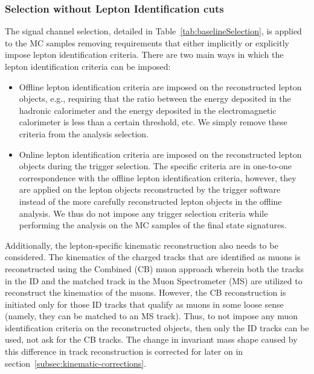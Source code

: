 \subsubsection{Selection without Lepton Identification cuts}
\label{subsec:SelectNoLepID}
The signal channel selection, detailed in Table~\ref{tab:baselineSelection}, is applied to the \Bhh MC samples removing requirements that either implicitly or explicitly impose lepton identification criteria. %
There are two main ways in which the lepton identification criteria can be imposed:
\begin{itemize}
    \item Offline lepton identification criteria are imposed on the reconstructed lepton objects, e.g., requiring that the ratio between the energy deposited in the hadronic calorimeter and the energy deposited in the electromagnetic calorimeter is less than a certain threshold, etc. We simply remove these criteria from the analysis selection. %
    \item Online lepton identification criteria are imposed on the reconstructed lepton objects during the trigger selection. The specific criteria are in one-to-one correspondence with the offline lepton identification criteria, however, they are applied on the lepton objects reconstructed by the trigger software instead of the more carefully reconstructed lepton objects in the offline analysis. We thus do not impose any trigger selection criteria while performing the analysis on the MC samples of the final state signatures. %
\end{itemize}
Additionally, the lepton-specific kinematic reconstruction also needs to be considered. 
The kinematics of the charged tracks that are identified as muons is reconstructed using the Combined (CB) muon approach wherein both the tracks in the ID and the matched track in the Muon Spectrometer (MS) are utilized to reconstruct the kinematics of the muons. However, the CB reconstruction is initiated only for those ID tracks that qualify as muons in some loose sense (namely, they can be matched to an MS track). Thus, to not impose any muon identification criteria on the reconstructed objects, then only the ID tracks can be used, not ask for the CB tracks.
The change in invariant mass shape caused by this difference in track reconstruction is corrected for later on in section~\ref{subsec:kinematic-corrections}. 

